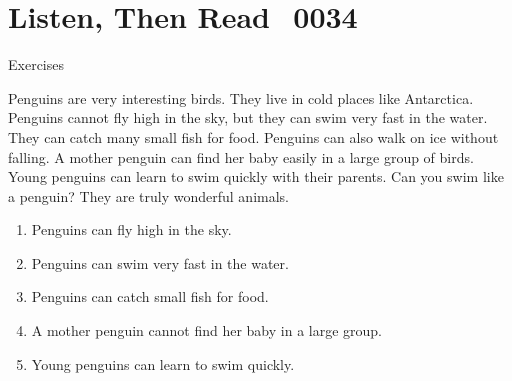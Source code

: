 \documentclass[aspectratio=169,xcolor={dvipsnames,table}]{beamer}
\newcommand{\myaudio}[1]{\href{#1}{\faVolumeUp}}
\begin{document}
\section{Listen, Then Read\,\,\,\,\,{\tiny 0034}\,{\scriptsize \myaudio{./audio/012_can_reading.mp3}}}
\begin{frame}[plain,t]{Exercises}
\begin{tcolorbox}[
  colframe=ForestGreen,
  colback=NavyBlue!10!white,
  colbacktitle=NavyBlue!40!white,
  coltitle=black, %
  before upper={\setlength{\parindent}{1.25em}},
  title={Amazing Penguins\hfill{\tiny 0047}\quad{\scriptsize \myaudio{./audio/012_can_reading.mp3}}}
]
Penguins are very interesting birds.
  They live in cold places like Antarctica.
  Penguins cannot fly high in the sky, but they can swim very fast in the water.
  They can catch many small fish for food.
  Penguins can also walk on ice without falling.
  A mother penguin can find her baby easily in a large group of birds.
  Young penguins can learn to swim quickly with their parents.
  Can you swim like a penguin? They are truly wonderful animals.
\end{tcolorbox}


\vspace{-4pt}  
\vspace{-11pt}
 \begin{enumerate}\setlength{\itemsep}{-3.2pt}
 \item<2-> Penguins can fly high in the sky.\hfill{}
 \item<2-> Penguins can swim very fast in the water.\hfill{}
 \item<2-> Penguins can catch small fish for food.\hfill{}
 \item<2-> A mother penguin cannot find her baby in a large group.\hfill{}
 \item<2-> Young penguins can learn to swim quickly.\hfill{}
 \end{enumerate}
 \end{frame}
\end{document}

